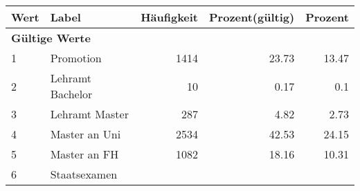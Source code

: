      \begin{longtable}{lXrrr}
     \toprule
     \textbf{Wert} & \textbf{Label} & \textbf{Häufigkeit} & \textbf{Prozent(gültig)} & \textbf{Prozent} \\
     \endhead
     \midrule
     \multicolumn{5}{l}{\textbf{Gültige Werte}}\\

     1 &
     \multicolumn{1}{X}{ Promotion   } &


       \num{1414} &
       \num[round-mode=places,round-precision=2]{23,73} &
         \num[round-mode=places,round-precision=2]{13,47} \\

     2 &
     \multicolumn{1}{X}{ Lehramt Bachelor   } &


       \num{10} &
       \num[round-mode=places,round-precision=2]{0,17} &
         \num[round-mode=places,round-precision=2]{0,1} \\

     3 &
     \multicolumn{1}{X}{ Lehramt Master   } &


       \num{287} &
       \num[round-mode=places,round-precision=2]{4,82} &
         \num[round-mode=places,round-precision=2]{2,73} \\

     4 &
     \multicolumn{1}{X}{ Master an Uni   } &


       \num{2534} &
       \num[round-mode=places,round-precision=2]{42,53} &
         \num[round-mode=places,round-precision=2]{24,15} \\

     5 &
     \multicolumn{1}{X}{ Master an FH   } &


       \num{1082} &
       \num[round-mode=places,round-precision=2]{18,16} &
         \num[round-mode=places,round-precision=2]{10,31} \\

     6 &
     \multicolumn{1}{X}{ Staatsexamen   } &



\end{longtable}
